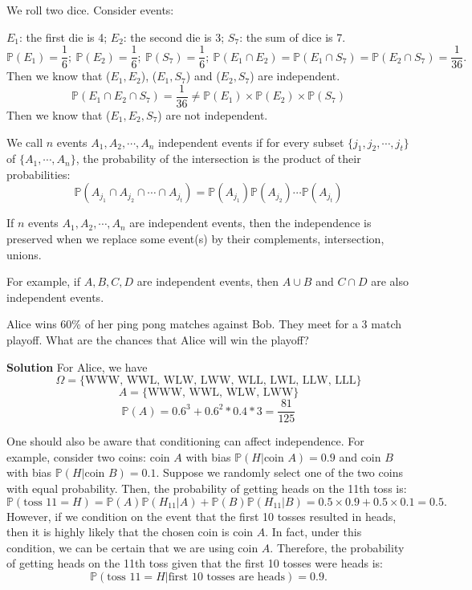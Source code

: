 \begin{eg}
    We roll two dice. Consider events:
    
    \(E_1\): the first die is 4; \(E_2\): the second die is 3; \(S_7\): the sum of dice is 7. 
    \[
    \mathbb{P}(E_1) = \dfrac{1}{6};\ \mathbb{P}(E_2) = \dfrac{1}{6};\ \mathbb{P}(S_7) = \dfrac{1}{6};\ \mathbb{P}(E_1 \cap E_2) = \mathbb{P}(E_1 \cap S_7) = \mathbb{P}(E_2 \cap S_7) = \dfrac{1}{36}.
    \]
    Then we know that (\(E_1, E_2\)), (\(E_1, S_7\)) and (\(E_2, S_7\)) are independent. 
    \[
        \mathbb{P}(E_1 \cap E_2 \cap S_7) = \dfrac{1}{36} \neq \mathbb{P}(E_1) \times \mathbb{P}(E_2) \times \mathbb{P}(S_7)
    \]
    Then we know that (\(E_1, E_2, S_7\)) are not independent. 
\end{eg}

We call \(n\) events \(A_1, A_2, \cdots, A_n\) independent events if for every subset \(\{j_1, j_2, \cdots, j_t\}\) of \(\{A_1, \cdots, A_n\}\), the probability of the intersection is the product of their probabilities:
\[
    \mathbb{P}(A_{j_1} \cap A_{j_2} \cap \cdots \cap A_{j_t}) = \mathbb{P}(A_{j_1})\mathbb{P}(A_{j_2})\cdots\mathbb{P}(A_{j_t})
\]

If \(n\) events \(A_1, A_2, \cdots, A_n\) are independent events, then the independence is preserved when we replace some event(s) by their complements, intersection, unions.

For example, if \(A, B, C, D\) are independent events, then \(A \cup B\) and \(C \cap D\) are also independent events.

\begin{eg}
    Alice wins 60\% of her ping pong matches against Bob. They meet for a 3 match playoff. What are the chances that Alice will win the playoff? 

    \textbf{Solution}
    For Alice, we have
    \[
        \Omega = \{\text{WWW, WWL, WLW, LWW, WLL, LWL, LLW, LLL}\}
    \]
    \[
        A = \{\text{WWW, WWL, WLW, LWW}\}
    \]
    \[
        \mathbb{P}(A) = 0.6^3 + 0.6^2*0.4*3 = \frac{81}{125}
    \]
\end{eg}

\begin{remark}
    One should also be aware that conditioning can affect independence. For example, consider two coins: coin \( A \) with bias \(\mathbb{P}(H \vert \text{coin } A) = 0.9\) and coin \( B \) with bias \(\mathbb{P}(H \vert \text{coin } B) = 0.1\). Suppose we randomly select one of the two coins with equal probability. Then, the probability of getting heads on the 11th toss is:
    \[
    \mathbb{P}(\text{toss 11} = H) = \mathbb{P}(A) \mathbb{P}(H_{11} \vert A) + \mathbb{P}(B) \mathbb{P}(H_{11} \vert B) = 0.5 \times 0.9 + 0.5 \times 0.1 = 0.5.
    \]
    However, if we condition on the event that the first 10 tosses resulted in heads, then it is highly likely that the chosen coin is coin \( A \). In fact, under this condition, we can be certain that we are using coin \( A \). Therefore, the probability of getting heads on the 11th toss given that the first 10 tosses were heads is:
    \[
    \mathbb{P}(\text{toss 11} = H \vert \text{first 10 tosses are heads}) = 0.9.
    \]
\end{remark}

